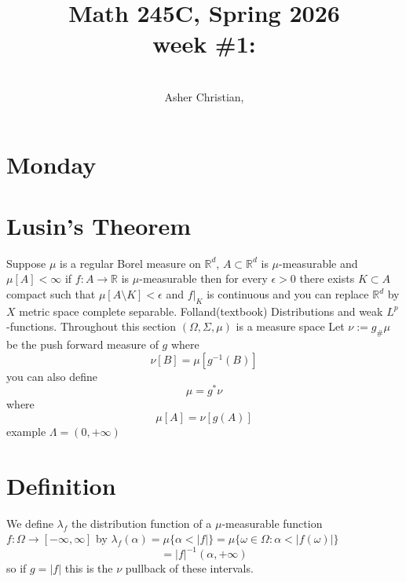 \documentclass[11pt]{article}
\newcommand{\cnum}{Math 245C}
\newcommand{\ced}{Spring 2026}
\newcommand{\ctitle}[4]{\title{\vspace{-0.5in}\cnum, \ced\\week #1: #2}\author{\vspace{-0.35in}\\#3, #4}}
\begin{document}
\ctitle{\#1}{}{Asher Christian}{}
\date{}
\maketitle

\section{Monday}

\section{Lusin's Theorem}
Suppose $\mu $ is a regular Borel measure on $ \mathbb{R}^{d}$,
$A \subset \mathbb{R}^{d}$ is $\mu $-measurable and $\mu[A] < \infty$ if $f : A \to \mathbb{R}$ is $\mu$-measurable  then
for every $\epsilon > 0$ there exists $K \subset A$ compact such that $\mu[A \setminus K] < \epsilon$ 
and $f|_K$ is continuous and you can replace  $ \mathbb{R}^{d}$ by $X$ metric space complete separable.
Folland(textbook)
Distributions and weak $L^{p}$-functions.
Throughout this section $(\Omega, \Sigma, \mu)$ is a measure space Let $\nu := g_\# \mu$ be the push forward measure of $g$ where
\[
    \nu[B] = \mu[g^{-1}(B)]
\] 
you can also define
\[
\mu = g^{*}\nu
\] 
where
\[
    \mu[A] = \nu[g(A)]
\] 
example $\Lambda = (0,+\infty)$
\section{Definition}
We define $\lambda_f$ the distribution function of a $\mu$-measurable function $f : \Omega \to [-\infty,\infty]$ by $\lambda_f(\alpha) = \mu\{ \alpha < |f|\} = \mu \{\omega \in \Omega: \alpha < |f(\omega)|\}$
\[
= |f|^{-1}(\alpha, +\infty)
\] 
so if $g = |f|$ this is the  $\nu$ pullback of these intervals.
\end{document}
